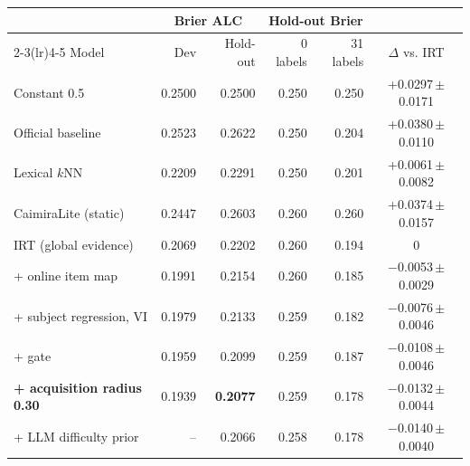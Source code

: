\begin{tabular}{@{}lrrrrc@{}}
\toprule
 & \multicolumn{2}{c}{Brier ALC} & \multicolumn{2}{c}{Hold-out Brier} & \\
\cmidrule(lr){2-3}\cmidrule(lr){4-5}
Model & Dev & Hold-out & 0 labels & 31 labels & $\Delta$ vs. IRT \\
\midrule
Constant 0.5 & 0.2500 & 0.2500 & 0.250 & 0.250 & +0.0297\,{\scriptsize$\pm$0.0171} \\
Official baseline & 0.2523 & 0.2622 & 0.250 & 0.204 & +0.0380\,{\scriptsize$\pm$0.0110} \\
Lexical $k$NN & 0.2209 & 0.2291 & 0.250 & 0.201 & +0.0061\,{\scriptsize$\pm$0.0082} \\
CaimiraLite (static) & 0.2447 & 0.2603 & 0.260 & 0.260 & +0.0374\,{\scriptsize$\pm$0.0157} \\ \midrule
IRT (global evidence) & 0.2069 & 0.2202 & 0.260 & 0.194 & 0 \\
+ online item map & 0.1991 & 0.2154 & 0.260 & 0.185 & $-$0.0053\,{\scriptsize$\pm$0.0029} \\
+ subject regression, VI & 0.1979 & 0.2133 & 0.259 & 0.182 & $-$0.0076\,{\scriptsize$\pm$0.0046} \\
+ gate & 0.1959 & 0.2099 & 0.259 & 0.187 & $-$0.0108\,{\scriptsize$\pm$0.0046} \\
\textbf{+ acquisition radius 0.30} & 0.1939 & \textbf{0.2077} & 0.259 & 0.178 & $-$0.0132\,{\scriptsize$\pm$0.0044} \\
+ LLM difficulty prior & -- & 0.2066 & 0.258 & 0.178 & $-$0.0140\,{\scriptsize$\pm$0.0040} \\
\bottomrule
\end{tabular}
